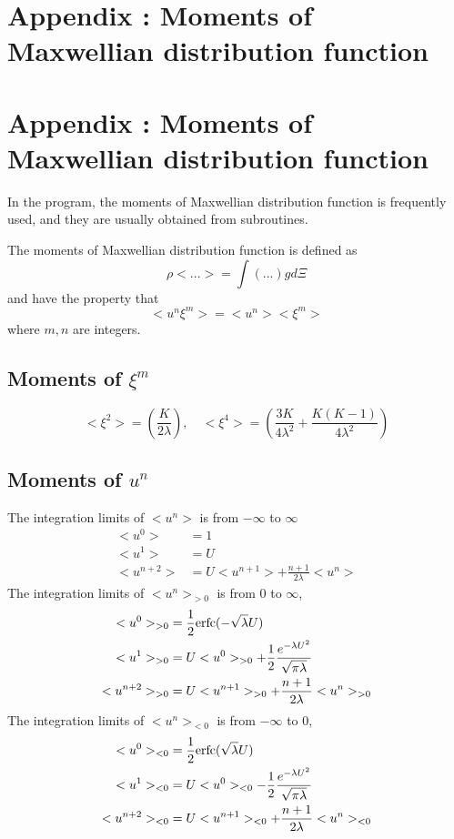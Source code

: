 \documentclass[a4paper]{book}
\makeatletter
\newcommand{\appxchapter}[2][\@empty]{
    \ifx\@empty#1
    \chapter{Appendix \Alph{chapter}: #2}
    \else
    \chapter[#1]{Appendix \Alph{chapter}: #2}
    \fi
}
\makeatother
\begin{document}
\begin{appendices}
    \setcounter{chapter}{1}

    \appxchapter{Moments of Maxwellian distribution function}
    \label{appendix:moments}
    In the program, the moments of Maxwellian distribution function is frequently used, and they are usually obtained from subroutines.

    The moments of Maxwellian distribution function is defined as
    $$\rho<...>=\int(...)gd\Xi$$
    and have the property that
    $$<u^n \xi^m> = <u^n><\xi^m>$$
    where $m,n$ are integers.

    \section*{Moments of $\xi^m$}
    $$<\xi^2>=\left(\frac{K}{2\lambda}\right),\quad <\xi^4>=\left(\frac{3K}{4\lambda^2}+\frac{K(K-1)}{4\lambda^2}\right)$$

    \section*{Moments of $u^n$}
    The integration limits of $<u^n>$ is from $-\infty$ to $\infty$
    $$
    \begin{aligned}
        <u^0> &= 1\\
        <u^1> &= U\\
        <u^{n+2}> &= U<u^{n+1}>+\frac{n+1}{2\lambda}<u^n>
    \end{aligned} 
    $$
    The integration limits of $<u^n>_{>0}$ is from $0$ to $\infty$,
    $$
    \begin{aligned}
        <u^0>_{>0} &= \frac{1}{2}{\rm erfc}(-\sqrt{\lambda}U) \\
        <u^1>_{>0} &= U<u^0>_{>0}+\frac{1}{2}\frac{e^{-\lambda U^2}}{\sqrt{\pi\lambda}} \\
        <u^{n+2}>_{>0} &= U<u^{n+1}>_{>0}+\frac{n+1}{2\lambda}<u^n>_{>0}
    \end{aligned} 
    $$
    The integration limits of $<u^n>_{<0}$ is from $-\infty$ to $0$,
    $$
    \begin{aligned}
        <u^0>_{<0} &= \frac{1}{2}{\rm erfc}(\sqrt{\lambda}U) \\
        <u^1>_{<0} &= U<u^0>_{<0}-\frac{1}{2}\frac{e^{-\lambda U^2}}{\sqrt{\pi\lambda}} \\
        <u^{n+2}>_{<0} &= U<u^{n+1}>_{<0}+\frac{n+1}{2\lambda}<u^n>_{<0}
    \end{aligned} 
    $$


\end{appendices}
\end{document}
